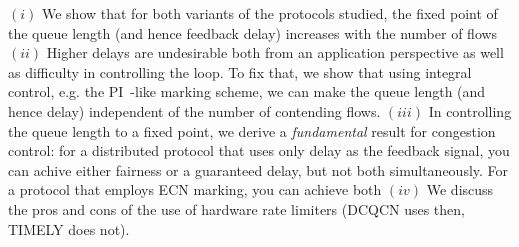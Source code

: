  $(i)$ We show that for both variants of
the protocols studied, the fixed point of the queue length (and hence
feedback delay) increases with the number of flows $(ii)$ Higher
delays are undesirable both from an application perspective as well as
difficulty in controlling the loop. To fix that, we show that using
integral control, e.g. the PI~\cite{Hollot:PIController}-like
marking scheme, we can make 
the queue length (and hence delay) independent of the number of contending
flows. $(iii)$ In controlling the queue length to a fixed point, we
derive a \emph{fundamental} result for congestion control: for a
distributed protocol that uses only delay as the feedback signal, you
can achive either fairness or a guaranteed delay, but not both simultaneously. For a
protocol that employs ECN marking, you can achieve both  $(iv)$ We discuss the pros and cons of the use of hardware rate limiters
(DCQCN uses then, TIMELY does not).

